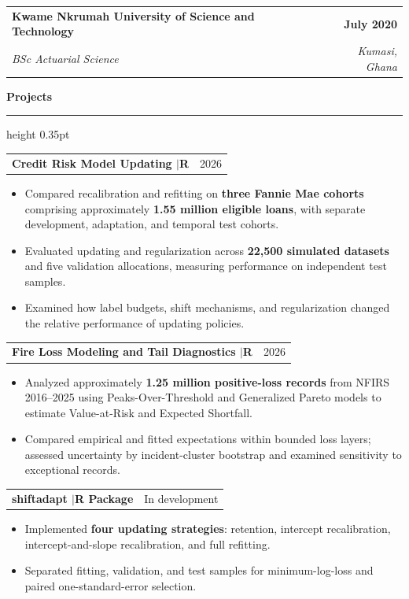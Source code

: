 \documentclass[11pt,letterpaper]{article}
\makeatletter
\newcommand{\cvsection}[1]{%
  \par\addvspace{4pt}
  {\large\bfseries #1}\par
  \nobreak\vspace{1pt}
  \hrule height 0.35pt
  \nobreak\vspace{3pt}
}
\newcommand{\entry}[4]{%
  \noindent\hspace*{6pt}%
  \begin{tabular*}{\dimexpr\textwidth-12pt\relax}
    {@{}l@{\extracolsep{\fill}}r@{}}
    {\normalsize\bfseries #1} & {\small\bfseries #2}\\
    {\small\itshape #3} & {\small\itshape #4}\\
  \end{tabular*}\par
}
\newcommand{\project}[2]{%
  \noindent\hspace*{6pt}%
  \begin{tabular*}{\dimexpr\textwidth-12pt\relax}
    {@{}l@{\extracolsep{\fill}}r@{}}
    {\normalsize\bfseries #1} & {\small #2}\\
  \end{tabular*}\par
}
\makeatother
\begin{document}
\entry
  {Kwame Nkrumah University of Science and Technology}
  {July 2020}
  {BSc Actuarial Science}
  {Kumasi, Ghana}


\cvsection{Projects}

\project
  {Credit Risk Model Updating
   \textnormal{\small\enspace$\vert$\enspace R}}
  {2026}

\begin{itemize}
  \item Compared recalibration and refitting on
  \textbf{three Fannie Mae cohorts} comprising approximately
  \textbf{1.55 million eligible loans}, with separate
  development, adaptation, and temporal test cohorts.

  \item Evaluated updating and regularization across
  \textbf{22,500 simulated datasets} and five validation
  allocations, measuring performance on independent
  test samples.

  \item Examined how label budgets, shift mechanisms,
  and regularization changed the relative performance
  of updating policies.
\end{itemize}

\vspace{2pt}

\project
  {Fire Loss Modeling and Tail Diagnostics
   \textnormal{\small\enspace$\vert$\enspace R}}
  {2026}

\begin{itemize}
  \item Analyzed approximately
  \textbf{1.25 million positive-loss records} from
  NFIRS 2016--2025 using Peaks-Over-Threshold and
  Generalized Pareto models to estimate Value-at-Risk
  and Expected Shortfall.

  \item Compared empirical and fitted expectations within
  bounded loss layers; assessed uncertainty by
  incident-cluster bootstrap and examined sensitivity
  to exceptional records.
\end{itemize}

\vspace{2pt}

\project
  {shiftadapt
   \textnormal{\small\enspace$\vert$\enspace R Package}}
  {In development}

\begin{itemize}
  \item Implemented \textbf{four updating strategies}:
  retention, intercept recalibration, intercept-and-slope
  recalibration, and full refitting.

  \item Separated fitting, validation, and test samples
  for minimum-log-loss and paired one-standard-error
  selection.
\end{itemize}
\end{document}
